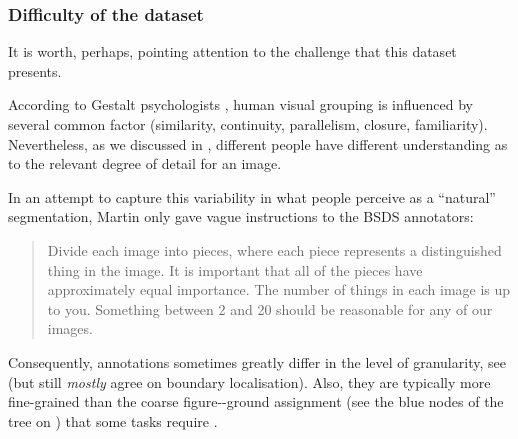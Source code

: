 \subsubsection*{Difficulty of the dataset}
It is worth, perhaps, pointing attention to the challenge that this dataset presents.

According to Gestalt psychologists \cite{Wertheimer1923untersuchungen,Kohler1929task,Koffka1935principles,Wertheimer1938laws}, human visual grouping is influenced by several common factor (\eg similarity, continuity, parallelism, closure, familiarity). Nevertheless, as we discussed in , different people have different understanding as to the relevant degree of detail for an image. 

In an attempt to capture this variability in what people perceive as a ``natural'' segmentation, Martin \etal \cite{Martin01} only gave vague instructions to the BSDS annotators: \begin{quote}Divide each image into pieces, where each piece represents a distinguished thing in the image. It is important that all of the pieces have approximately equal importance. The number of things in each image is up to you. Something between 2 and 20 should be reasonable for any of our images.\end{quote}

Consequently, annotations sometimes greatly differ in the level of granularity, see  (but still {\it mostly} agree on boundary localisation). Also, they are typically more fine-grained than the coarse %
figure-\vs-ground assignment (see the blue nodes of the tree on ) that some tasks require \cite{Ren2006figure,Sundberg2011occlusion}.

